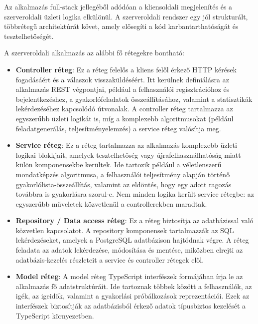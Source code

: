 \documentclass[12pt,a4paper]{report}
\begin{document}
Az alkalmazás full-stack jellegéből adódóan a kliensoldali megjelenítés és a szerveroldali üzleti logika elkülönül. A szerveroldali rendszer egy jól strukturált, többrétegű architektúrát követ, amely elősegíti a kód karbantarthatóságát és tesztelhetőségét.

A szerveroldali alkalmazás az alábbi fő rétegekre bontható:

\begin{itemize}
    \item \textbf{Controller réteg}: Ez a réteg felelős a kliens felől érkező HTTP kérések fogadásáért és a válaszok visszaküldéséért. Itt kerülnek definiálásra az alkalmazás REST végpontjai, például a felhasználói regisztrációhoz és bejelentkezéshez, a gyakorlófeladatok összeállításához, valamint a statisztikák lekérdezéséhez kapcsolódó útvonalak. A controller réteg tartalmazza az egyszerűbb üzleti logikát is, míg a komplexebb algoritmusokat (például feladatgenerálás, teljesítményelemzés) a service réteg valósítja meg.
    
    \item \textbf{Service réteg}: Ez a réteg tartalmazza az alkalmazás komplexebb üzleti logikai blokkjait, amelyek tesztelhetőség vagy újrafelhasználhatóság miatt külön komponensekbe kerültek. Ide tartozik például a véletlenszerű mondatképzés algoritmusa, a felhasználói teljesítmény alapján történő gyakorlólista-összeállítás, valamint az eldöntés, hogy egy adott ragozás továbbra is gyakorlásra szorul-e. Nem minden logika került service rétegbe: az egyszerűbb műveletek közvetlenül a controllerekben maradtak.
    
    \item \textbf{Repository / Data access réteg}: Ez a réteg biztosítja az adatbázissal való közvetlen kapcsolatot. A repository komponensek tartalmazzák az SQL lekérdezéseket, amelyek a PostgreSQL adatbázison hajtódnak végre. A réteg feladata az adatok lekérdezése, módosítása és mentése, miközben elrejti az adatbázis-kezelés részleteit a service és controller rétegek elől.
    
    \item \textbf{Model réteg}: A model réteg TypeScript interfészek formájában írja le az alkalmazás fő adatstruktúráit. Ide tartoznak többek között a felhasználók, az igék, az igeidők, valamint a gyakorlási próbálkozások reprezentációi. Ezek az interfészek biztosítják az adatbázisból érkező adatok típusbiztos kezelését a TypeScript környezetben.
\end{itemize}
\end{document}
